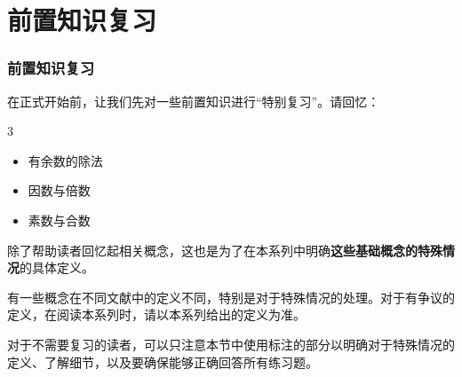 
\section{前置知识复习}
\begin{frame}
  \frametitle{前置知识复习}
  在正式开始前，让我们先对一些前置知识进行“特别复习”。请回忆：
  \begin{mymulticols}[l][l]{3}
    \begin{itemize}
      \item 有余数的除法
      \item 因数与倍数
      \item 素数与合数
    \end{itemize}
  \end{mymulticols}
  \pause
  
  \emptyline
  除了帮助读者回忆起相关概念，这也是为了在本系列中明确\textbf{这些基础概念的特殊情况}的具体定义。
  
  有一些概念在不同文献中的定义不同，特别是对于特殊情况的处理。对于有争议的定义，在阅读本系列时，请以本系列给出的定义为准。
  \pause
  
  \emptyline
  对于不需要复习的读者，可以只注意本节中使用标注的部分以明确对于特殊情况的定义、了解细节，以及要确保能够正确回答所有练习题。
\end{frame}
